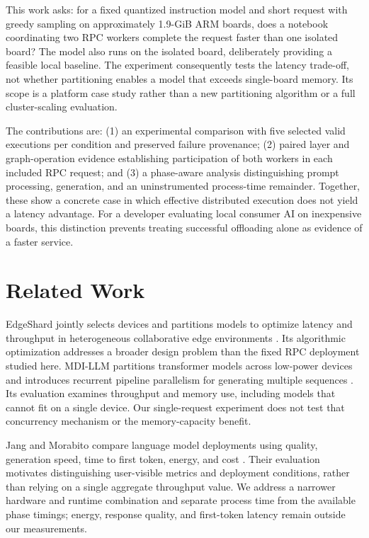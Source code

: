 \documentclass[letterpaper,conference]{IEEEtran}
\begin{document}
This work asks: for a fixed quantized instruction model and short request with greedy sampling on approximately 1.9-GiB ARM boards, does a notebook coordinating two RPC workers complete the request faster than one isolated board? The model also runs on the isolated board, deliberately providing a feasible local baseline. The experiment consequently tests the latency trade-off, not whether partitioning enables a model that exceeds single-board memory. Its scope is a platform case study rather than a new partitioning algorithm or a full cluster-scaling evaluation.

The contributions are: (1) an experimental comparison with five selected valid executions per condition and preserved failure provenance; (2) paired layer and graph-operation evidence establishing participation of both workers in each included RPC request; and (3) a phase-aware analysis distinguishing prompt processing, generation, and an uninstrumented process-time remainder. Together, these show a concrete case in which effective distributed execution does not yield a latency advantage. For a developer evaluating local consumer AI on inexpensive boards, this distinction prevents treating successful offloading alone as evidence of a faster service.

\section{Related Work}

EdgeShard jointly selects devices and partitions models to optimize latency and throughput in heterogeneous collaborative edge environments \cite{edgeshard}. Its algorithmic optimization addresses a broader design problem than the fixed RPC deployment studied here. MDI-LLM partitions transformer models across low-power devices and introduces recurrent pipeline parallelism for generating multiple sequences \cite{mdillm}. Its evaluation examines throughput and memory use, including models that cannot fit on a single device. Our single-request experiment does not test that concurrency mechanism or the memory-capacity benefit.

Jang and Morabito compare language model deployments using quality, generation speed, time to first token, energy, and cost \cite{edgefirst}. Their evaluation motivates distinguishing user-visible metrics and deployment conditions, rather than relying on a single aggregate throughput value. We address a narrower hardware and runtime combination and separate process time from the available phase timings; energy, response quality, and first-token latency remain outside our measurements.
\end{document}
